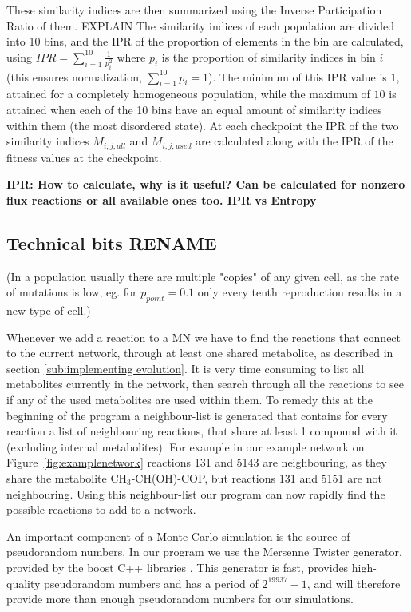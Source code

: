 \documentclass[a4paper,12pt]{article}
\begin{document}
These similarity indices are then summarized using the Inverse Participation Ratio of them. EXPLAIN  The similarity indices of each population are divided into 10 bins, and the IPR of the proportion of elements in the bin are calculated, using $IPR= \sum^{10}_{i=1} \frac{1}{p_i^2} $ where $p_i$ is the proportion of similarity indices in bin $i$ (this ensures normalization, $ \sum^{10}_{i=1} p_i=1$). The minimum of this IPR value is $1$, attained for a completely homogeneous population, while the maximum of $10$ is attained when each of the 10 bins have an equal amount of similarity indices within them (the most disordered state).  At each checkpoint the IPR of the two similarity indices $M_{i,j,all}$ and $M_{i,j,used}$ are calculated along with the IPR of the fitness values at the checkpoint. 

\textbf{IPR: How to calculate, why is it useful? Can be calculated for nonzero flux reactions or all available ones too. IPR vs Entropy}






\subsection{Technical bits RENAME}
\label{sub:technical_bits}

(In a population usually there are multiple "copies" of any given cell, as the rate of mutations is low, eg. for $p_{point}=0.1$ only every tenth reproduction results in a new type of cell.)

	Whenever we add a reaction to a MN we have to find the reactions that connect to the current network, through at least one shared metabolite, as described in section \ref{sub:implementing evolution}. It is very time consuming to list all metabolites currently in the network, then search through all the reactions to see if any of the used metabolites are used within them. To remedy this at the beginning of the program a neighbour-list is generated that contains for every reaction a list of neighbouring reactions, that share at least 1 compound with it (excluding internal metabolites). For example in our example network on Figure~\ref{fig:examplenetwork} reactions 131 and 5143 are neighbouring, as they share the metabolite CH$_3$-CH(OH)-COP, but reactions 131 and 5151 are not neighbouring. Using this neighbour-list our program can now rapidly find the possible reactions to add to a network. 

	An important component of a Monte Carlo simulation is the source of pseudorandom numbers. In our program we use the Mersenne Twister \cite{mersennetwister} generator, provided by the boost C++ libraries \cite{boostlibraries}. This generator is fast, provides high-quality pseudorandom numbers and has a period of $2^{19937}-1$, and will therefore provide more than enough pseudorandom numbers for our simulations.
\end{document}
